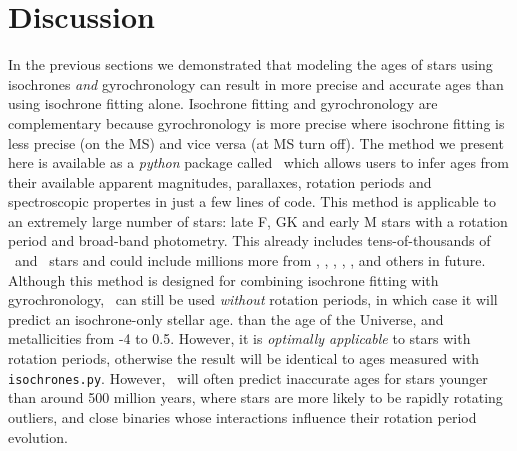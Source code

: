 \section{Discussion}
\label{section:discussion}

In the previous sections we demonstrated that modeling the ages of stars using
isochrones {\it and} gyrochronology can result in more precise and accurate
ages than using isochrone fitting alone.
Isochrone fitting and gyrochronology are  complementary because gyrochronology
is more precise where isochrone fitting is less precise (on the MS) and vice
versa (at MS turn off).
The method we present here is available as a {\it python} package called \sd\
which allows users to infer ages from their available apparent magnitudes,
parallaxes, rotation periods and spectroscopic propertes in just a few lines
of code.
This method is applicable to an extremely large number of stars: late F, GK
and early M stars with a rotation period and broad-band photometry.
This already includes tens-of-thousands of \kepler\ and \ktwo\ stars and could
include millions more from \tess, \lsst, \wfirst, \plato, \gaia, and others in
future.
Although this method is designed for combining isochrone fitting with
gyrochronology, \sd\ can still be used {\it without} rotation periods, in
which case it will predict an isochrone-only stellar age.
than the age of the Universe, and metallicities from -4 to 0.5.
However, it is {\it optimally applicable} to stars with rotation periods,
otherwise the result will be identical to ages measured with {\tt
isochrones.py}.
However, \sd\ will often predict inaccurate ages for stars younger than around
500 million years, where stars are more likely to be rapidly rotating
outliers, and close binaries whose interactions influence their rotation
period evolution.
